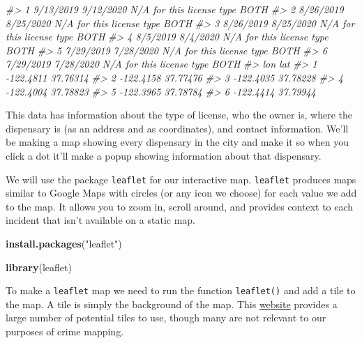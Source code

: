 \documentclass[
  12pt,
]{book}
\newenvironment{Shaded}{\begin{snugshade}}{\end{snugshade}}
\newcommand{\CommentTok}[1]{\textcolor[rgb]{0.56,0.35,0.01}{\textit{#1}}}
\newcommand{\KeywordTok}[1]{\textcolor[rgb]{0.13,0.29,0.53}{\textbf{#1}}}
\newcommand{\NormalTok}[1]{#1}
\newcommand{\StringTok}[1]{\textcolor[rgb]{0.31,0.60,0.02}{#1}}
\begin{document}
\begin{Shaded}
\begin{Highlighting}[]
\CommentTok{\#> 1  9/13/2019       9/12/2020 N/A for this license type                BOTH}
\CommentTok{\#> 2  8/26/2019       8/25/2020 N/A for this license type                BOTH}
\CommentTok{\#> 3  8/26/2019       8/25/2020 N/A for this license type                BOTH}
\CommentTok{\#> 4   8/5/2019        8/4/2020 N/A for this license type                BOTH}
\CommentTok{\#> 5  7/29/2019       7/28/2020 N/A for this license type                BOTH}
\CommentTok{\#> 6  7/29/2019       7/28/2020 N/A for this license type                BOTH}
\CommentTok{\#>         lon      lat}
\CommentTok{\#> 1 {-}122.4811 37.76314}
\CommentTok{\#> 2 {-}122.4158 37.77476}
\CommentTok{\#> 3 {-}122.4035 37.78228}
\CommentTok{\#> 4 {-}122.4004 37.78823}
\CommentTok{\#> 5 {-}122.3965 37.78784}
\CommentTok{\#> 6 {-}122.4414 37.79944}
\end{Highlighting}
\end{Shaded}

This data has information about the type of license, who the owner is, where the dispensary is (as an address and as coordinates), and contact information. We'll be making a map showing every dispensary in the city and make it so when you click a dot it'll make a popup showing information about that dispensary.

We will use the package \texttt{leaflet} for our interactive map. \texttt{leaflet} produces maps similar to Google Maps with circles (or any icon we choose) for each value we add to the map. It allows you to zoom in, scroll around, and provides context to each incident that isn't available on a static map.

\begin{Shaded}
\begin{Highlighting}[]
\KeywordTok{install.packages}\NormalTok{(}\StringTok{"leaflet"}\NormalTok{)}
\end{Highlighting}
\end{Shaded}

\begin{Shaded}
\begin{Highlighting}[]
\KeywordTok{library}\NormalTok{(leaflet)}
\end{Highlighting}
\end{Shaded}

To make a \texttt{leaflet} map we need to run the function \texttt{leaflet()} and add a tile to the map. A tile is simply the background of the map. This \href{https://leaflet-extras.github.io/leaflet-providers/preview/}{website} provides a large number of potential tiles to use, though many are not relevant to our purposes of crime mapping.
\end{document}

